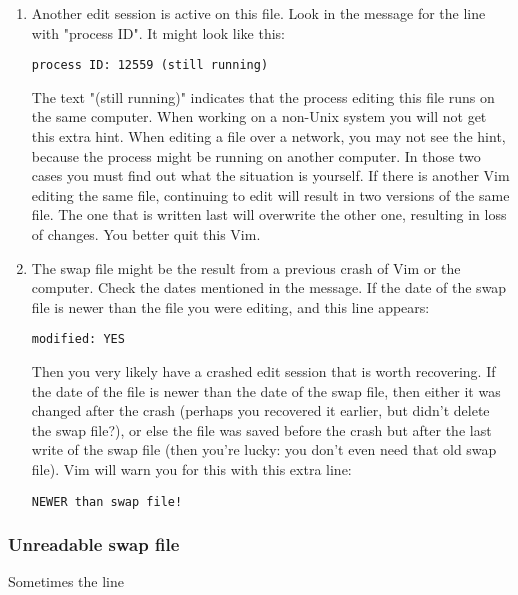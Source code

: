 \begin{enumerate}
				\item Another edit session is active on this file.  Look in the message for the line with "process ID".  It might look like this:

								\begin{Verbatim}[samepage=true]
				process ID: 12559 (still running) 
								\end{Verbatim}

								The text "(still running)" indicates that the process editing this file runs on the same computer.
								When working on a non-Unix system you will not get this extra hint.
								When editing a file over a network, you may not see the hint, because the process might be running on another computer.
								In those two cases you must find out what the situation is yourself.
								If there is another Vim editing the same file, continuing to edit will result in two versions of the same file.
								The one that is written last will overwrite the other one, resulting in loss of changes.
								You better quit this Vim.

				\item The swap file might be the result from a previous crash of Vim or the
								computer.  Check the dates mentioned in the message.  If the date of the
								swap file is newer than the file you were editing, and this line appears:

								\begin{Verbatim}[samepage=true]
				modified: YES 
								\end{Verbatim}

								Then you very likely have a crashed edit session that is worth recovering.
								If the date of the file is newer than the date of the swap file, then either it was changed after the crash (perhaps you recovered it earlier, but didn't delete the swap file?), or else the file was saved before the crash but after the last write of the swap file (then you're lucky: you don't even need that old swap file).
								Vim will warn you for this with this extra line:

								\begin{Verbatim}[samepage=true]
			NEWER than swap file! 
								\end{Verbatim}
\end{enumerate}

\subsubsection{Unreadable swap file}
Sometimes the line

